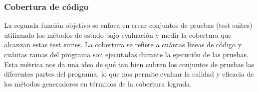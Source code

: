 


\subsubsection{Cobertura de código}
\label{sec:fitnessRandoop}



La segunda función objetivo se enfoca en crear conjuntos de pruebas (test suites) utilizando los métodos de estado bajo evaluación y medir la cobertura que alcanzan estas test suites. La cobertura se refiere a cuántas líneas de código y cuántas ramas del programa son ejecutadas durante la ejecución de las pruebas. Esta métrica nos da una idea de qué tan bien cubren los conjuntos de pruebas las diferentes partes del programa, lo que nos permite evaluar la calidad y eficacia de los métodos generadores en términos de la cobertura lograda.


